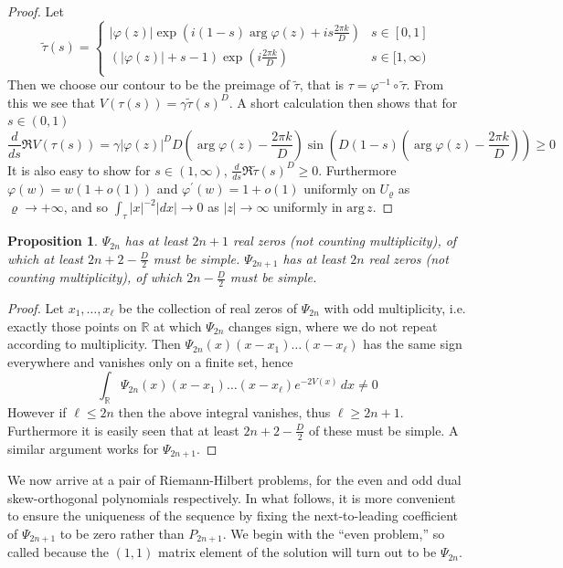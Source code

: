 \documentclass[12pt]{article}
\newtheorem{proposition}[theorem]{Proposition}
\theoremstyle{definition}
\begin{document}
\begin{proof}
Let
$$\tilde{\tau} (s) =
\begin{cases}
 |\varphi(z)| \exp\left(i (1-s)\arg \varphi(z) + is\frac{2\pi k}{D} \right) & s \in [0,1] \\
 (|\varphi(z)|+s-1) \exp(i \frac{2\pi k}{D} ) & s \in [1,\infty) \\
\end{cases}
$$
Then we choose our contour to be the preimage of $\tilde{\tau}$,  that is $\tau= \varphi^{-1} \circ \tilde{\tau}$. From this we see that $V(\tau(s)) = \gamma \tilde{\tau}(s)^D$. A short calculation then shows that for $s \in (0,1)$
$$\frac{d}{ds} \Re  V(\tau(s)) = \gamma |\varphi(z)|^D D \left( \arg \varphi(z) - \frac{2\pi k}{D} \right) \sin\left( D (1-s) \left( \arg \varphi(z) - \frac{2\pi k}{D} \right) \right)  \geq 0$$
It is also easy to show for $s \in (1,\infty)$, $\frac{d}{ds} \Re  \tilde{\tau}(s)^D \geq 0$. Furthermore $\varphi(w) = w (1+o(1))$ and $\varphi^\prime(w) = 1+o(1)$ uniformly on $U_\varrho$  as $\varrho \to +\infty$,  and so $\int_\tau |x|^{-2} |dx| \to 0$ as $|z| \to \infty$ uniformly in $\mathrm{arg} \, z$.
\end{proof}

\begin{proposition}
$\Psi_{2n}$ has at least $2n+1$ real zeros (not counting multiplicity), of which at least $2n+2-\frac{D}{2}$ must be simple. $\Psi_{2n+1}$ has at least $2n$ real zeros (not counting multiplicity), of which $2n - \frac{D}{2}$ must be simple.
\end{proposition}
\begin{proof}
Let $ x_1, \dots, x_\ell$ be the collection of real zeros of $\Psi_{2n}$ with odd multiplicity, i.e. exactly those points on $\mathbb{R}$ at which $\Psi_{2n}$ changes sign, where we do not repeat according to multiplicity. Then $\Psi_{2n}(x)(x-x_1)\dots (x-x_\ell)$ has the same sign everywhere and vanishes only on a finite set, hence
$$\int_\mathbb{R} \Psi_{2n}(x)(x-x_1)\dots (x-x_\ell) e^{-2V(x)} \, dx \neq 0 $$
However if $\ell \leq 2n$ then the above integral vanishes, thus $\ell \geq 2n+1$.  Furthermore it is easily seen that at least $2n+2-\frac{D}{2}$ of these must be simple. A similar argument works for $\Psi_{2n+1}$.
\end{proof}

We now arrive at a pair of Riemann-Hilbert problems,  for the even and odd dual skew-orthogonal polynomials respectively.  In what follows, it is more convenient to ensure the uniqueness of the sequence by fixing the next-to-leading coefficient of $\Psi_{2n+1}$ to be zero rather than $P_{2n+1}$. We begin with the \enquote{even problem,} so called because the $(1,1)$ matrix element of the solution will turn out to be $\Psi_{2n}$.
\end{document}
